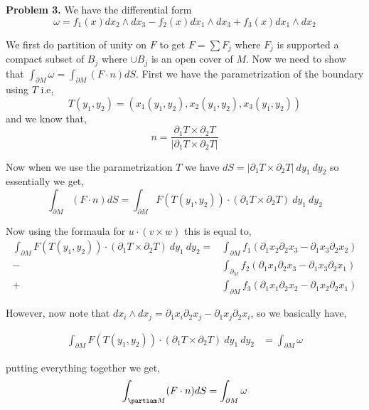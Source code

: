\documentclass[a4paper]{article}
\begin{document}
\vspace{1em}

\textbf{Problem 3.}
We have the differential form $$\omega = f_{1}(x) dx_{2} \wedge dx_{3} - f_{2}(x) dx_{1} \wedge dx_{3} + f_{3}(x) dx_{1} \wedge dx_{2}$$


We first do partition of unity on $F$  to get $F = \sum F_j$ where $F_j$ is supported a compact subset of $B_j$ where $\cup B_j$ is an open cover of $M$. Now we need to show that $\int_{\partial M}^{}  \omega = \int_{\partial M}^{}  (F \cdot n) dS$. First we have the parametrization of the boundary using $T$ i.e, 
\[
  T(y_{1}, y_{2}) = (x_{1}(y_{1}, y_{2}), x_{2}(y_{1}, y_{2}), x_{3}(y_{1}, y_{2}))
\]
and we know that,
\[
  n = \frac{\partial_{1} T \times \partial_{2}T }{\left | \partial_{1} T \times \partial_{2}T \right |}
\]

Now when we use the parametrization $T$ we have $dS = |\partial_{1} T \times \partial_{2} T| \ dy_{1} \ dy_{2}$ so essentially we get, 
\[
  \int_{\partial M}^{}  (F \cdot n) dS =   \int_{\partial M}^{}  F(T(y_{1}, y_{2})) \cdot (\partial_{1} T \times \partial_{2} T) \ dy_{1} \ dy_{2}
\]

Now using the formaula for $u \cdot (v \times w)$ this is equal to, 
\begin{align*}
  \int_{\partial M}^{}  F(T(y_{1}, y_{2})) \cdot (\partial_{1} T \times \partial_{2} T) \ dy_{1} \ dy_{2} =&\int_{\partial M}^{}  f_{1}(\partial_{1} x_{2}\partial_{2}x_{3} - \partial_{1}x_{3}\partial_{2}x_{2})\\ -&\int_{\partial_M}^{}   f_{2}(\partial_{1}x_{1}\partial_{2}x_{3} - \partial_{1}x_{3}\partial_{2}x_{1})  \\+ &\int_{\partial M}^{} f_{3}(\partial_{1} x_{1}\partial_{2}x_{2} - \partial_{1} x_{2}\partial_{2}x_{1})
\end{align*}

However, now note that $dx_{i} \wedge dx_j = \partial_{1} x_{i}\partial_{2}x_{j} - \partial_{1}x_{j}\partial_{2}x_{i}$, so we basically have, 

\begin{align*}
  \int_{\partial M}^{}  F(T(y_{1}, y_{2})) \cdot (\partial_{1} T \times \partial_{2} T) \ dy_{1} \ dy_{2} &= \int_{\partial M}^{}  \omega
\end{align*}

putting everything together we get, 
\[
  \int_{\partiam M}^{} (F \cdot n) dS = \int_{\partial M}^{}  \omega
\]


\end{document}
